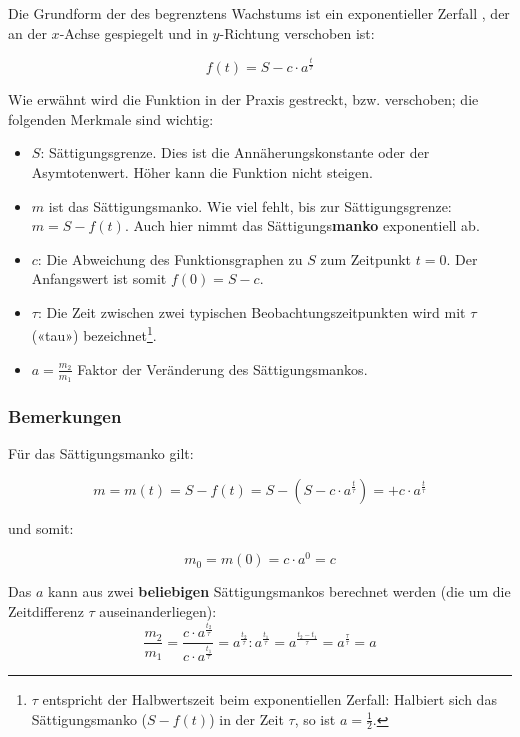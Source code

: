 Die Grundform der des begrenztens Wachstums ist ein exponentieller Zerfall ,
der an der $x$-Achse gespiegelt und in $y$-Richtung
verschoben ist:

$$f(t) =S - c\cdot{} a^{\frac{t}{\tau}}$$

Wie erwähnt wird die Funktion in der Praxis gestreckt, bzw. verschoben; die folgenden Merkmale sind wichtig:

\begin{itemize}
	\item $S$: Sättigungsgrenze. Dies ist die Annäherungskonstante oder der Asymtotenwert. Höher kann die Funktion nicht steigen.

	\item $m$ ist das Sättigungsmanko. Wie viel fehlt, bis zur
    Sättigungsgrenze: $m = S - f(t)$. Auch hier nimmt das  Sättigungs\textbf{manko} exponentiell ab.
	\item $c$: Die Abweichung des Funktionsgraphen zu $S$ zum Zeitpunkt $t=0$. Der
    Anfangswert ist somit $f(0) = S - c$.
	\item $\tau$: Die Zeit zwischen zwei typischen Beobachtungszeitpunkten wird
    mit $\tau$ («tau») bezeichnet\footnote{$\tau$ entspricht der
      Halbwertszeit beim exponentiellen Zerfall: Halbiert sich das Sättigungsmanko ($S-f(t)$) in der Zeit $\tau$, so ist $a = \frac12$.}.
    \item $a=\frac{m_2}{m_1}$ Faktor der Veränderung des Sättigungsmankos.
\end{itemize}
\newpage


\subsubsection{Bemerkungen}
\begin{bemerkung}{}{}
  Für das Sättigungsmanko gilt:

$$m = m(t) = S-f(t) = S- \left(S-c\cdot{}a^{\frac{t}{\tau}}\right) = + c\cdot{}a^{\frac{t}{\tau}}$$

und somit:

$$m_0 = m(0) = c\cdot{}a^0 = c$$
\end{bemerkung}

\begin{bemerkung}{}{}
Das $a$ kann aus zwei \textbf{beliebigen} Sättigungsmankos berechnet werden (die um die
Zeitdifferenz $\tau$ auseinanderliegen):
$$\frac{m_2}{m_1} = \frac{c\cdot{}a^{\frac{t_2}{\tau}}}{c\cdot{}
  a^{\frac{t_1}{\tau}}} = a^{\frac{t_2}{\tau}} : a^{\frac{t_1}{\tau}} =
a^{\frac{t_2-t_1}{\tau}} = a^{\frac{\tau}{\tau}} = a$$
\end{bemerkung}


